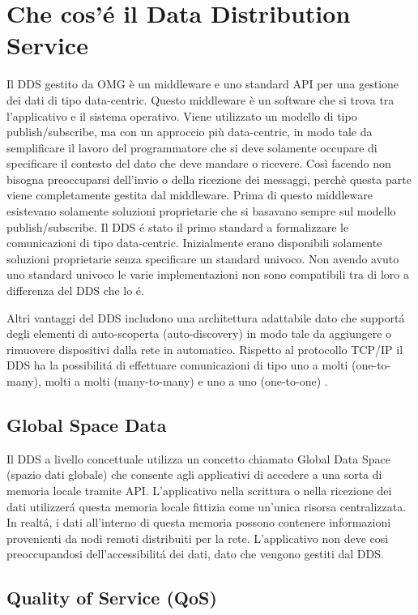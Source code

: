 \section{Che cos'é il Data Distribution Service}

Il DDS gestito da OMG è un middleware e uno standard API per una gestione
dei dati di tipo data-centric. Questo middleware è un software che si trova
tra l'applicativo e il sistema operativo. Viene utilizzato un modello
di tipo publish/subscribe, ma con un approccio più data-centric, in modo
tale da semplificare il lavoro del programmatore che si deve solamente
occupare di specificare il contesto del dato che deve mandare o ricevere.
Così facendo non bisogna preoccuparsi dell'invio o della ricezione
dei messaggi, perchè questa parte viene completamente gestita dal middleware.
Prima di questo middleware esistevano solamente soluzioni proprietarie che si 
basavano sempre sul modello publish/subscribe. Il DDS é stato il primo standard
a formalizzare le comunicazioni di tipo data-centric. Inizialmente erano 
disponibili solamente soluzioni proprietarie senza specificare un standard
univoco. Non avendo avuto uno standard univoco le varie implementazioni non sono
compatibili tra di loro a differenza del DDS che lo é.

Altri vantaggi del DDS includono una architettura adattabile dato che supportá
degli elementi di auto-scoperta (auto-discovery) in modo tale da aggiungere o 
rimuovere dispositivi dalla rete in automatico. Rispetto al protocollo TCP/IP 
il DDS ha la possibilitá di effettuare comunicazioni di tipo uno a molti 
(one-to-many), molti a molti (many-to-many) e uno a uno (one-to-one)
 \cite{1494965}.

\subsection{Global Space Data}
Il DDS a livello concettuale utilizza un concetto chiamato Global Data 
Space (spazio dati globale) che consente agli applicativi
di accedere a una sorta di memoria locale tramite API.
L'applicativo nella scrittura o nella ricezione dei dati utilizzerá 
questa memoria locale fittizia come un'unica risorsa centralizzata.
In realtá, i dati all'interno di questa memoria possono contenere
informazioni provenienti da nodi remoti distribuiti per la rete. 
L'applicativo non deve cosi preoccupandosi dell'accessibilitá dei dati,
dato che vengono gestiti dal DDS.\cite{whatisdds}


\subsection{Quality of Service (QoS)}


